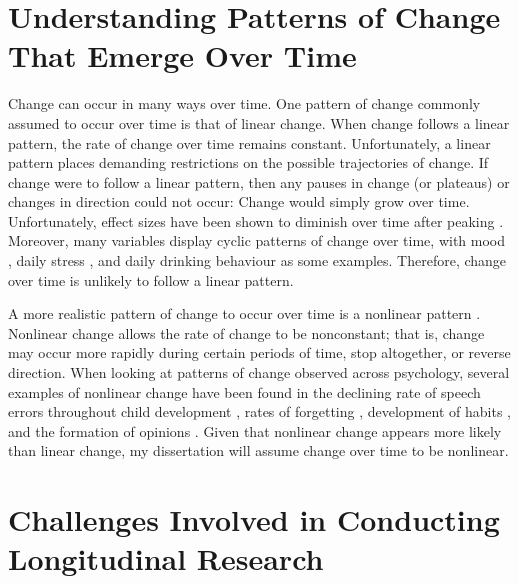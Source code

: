 \documentclass[
12pt, %
twoside,
english]{guelphthesis}
\begin{document}
\hypertarget{understanding-patterns-of-change-that-emerge-over-time}{%
\section{Understanding Patterns of Change That Emerge Over Time}\label{understanding-patterns-of-change-that-emerge-over-time}}

Change can occur in many ways over time. One pattern of change commonly assumed to occur over time is that of linear change. When change follows a linear pattern, the rate of change over time remains constant. Unfortunately, a linear pattern places demanding restrictions on the possible trajectories of change. If change were to follow a linear pattern, then any pauses in change (or plateaus) or changes in direction could not occur: Change would simply grow over time. Unfortunately, effect sizes have been shown to diminish over time after peaking \autocites[for meta-analytic examples, see][]{cohen1993,griffeth2000,hom1992,riketta2008,steel1984,steel1990}. Moreover, many variables display cyclic patterns of change over time, with mood \autocite{larsen1990}, daily stress \autocite{bodenmann2010}, and daily drinking behaviour \autocite{huh2015} as some examples. Therefore, change over time is unlikely to follow a linear pattern.

A more realistic pattern of change to occur over time is a nonlinear pattern \autocite[for a review, see][]{cudeck2007}. Nonlinear change allows the rate of change to be nonconstant; that is, change may occur more rapidly during certain periods of time, stop altogether, or reverse direction. When looking at patterns of change observed across psychology, several examples of nonlinear change have been found in the declining rate of speech errors throughout child development \autocite{burchinal1991}, rates of forgetting \autocite{murre2015}, development of habits \autocite{fournier2017}, and the formation of opinions \autocite{xia2020}. Given that nonlinear change appears more likely than linear change, my dissertation will assume change over time to be nonlinear.

\hypertarget{challenges-involved-in-conducting-longitudinal-research}{%
\section{Challenges Involved in Conducting Longitudinal Research}\label{challenges-involved-in-conducting-longitudinal-research}}
\end{document}
